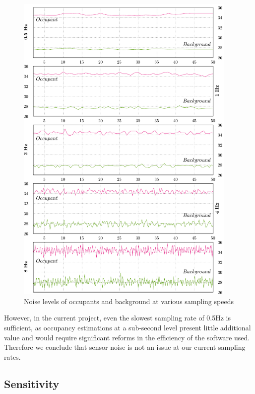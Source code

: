 \documentclass[../thesis/thesis.tex]{subfiles}
\begin{document}
\begin{figure}
  \centering
  \includegraphics[width=0.95\textwidth]{../diagrams/noise-graph.pdf}
  \caption{Noise levels of occupants and background at various sampling speeds}
  \label{fig:noise}
\end{figure}

However, in the current project, even the slowest sampling rate of 0.5Hz is sufficient, as occupancy estimations at a sub-second level present little additional value and would require significant reforms in the efficiency of the software used. Therefore we conclude that sensor noise is not an issue at our current sampling rates.





\subsection{Sensitivity}
\label{subsec:sensitivity}
\end{document}
